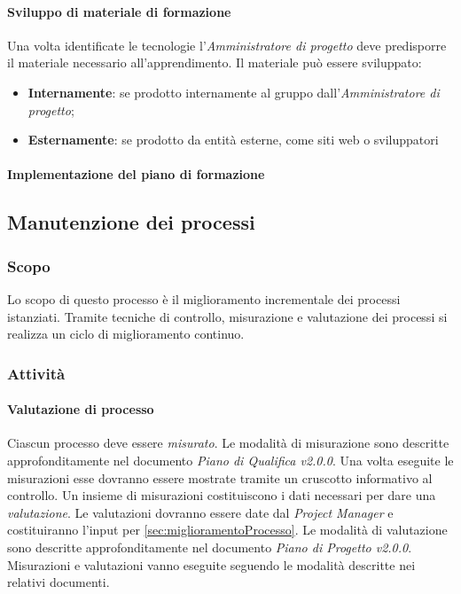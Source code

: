	\paragraph{Sviluppo di materiale di formazione} \Spazio
	Una volta identificate le tecnologie l'\emph{Amministratore di progetto} deve predisporre il materiale necessario all'apprendimento. Il materiale può essere sviluppato: 
	\begin{itemize}
		\item \textbf{Internamente}: se prodotto internamente al gruppo dall'\emph{Amministratore di progetto};
		\item \textbf{Esternamente}: se prodotto da entità esterne, come siti web o sviluppatori 
	\end{itemize}

	\paragraph{Implementazione del piano di formazione} \Spazio


\subsection{Manutenzione dei processi}
\label{sec:manutenzioneProcessi}
\subsubsection{Scopo}
Lo scopo di questo processo è il miglioramento incrementale dei processi istanziati. Tramite tecniche di controllo, misurazione e valutazione dei processi si realizza un ciclo di miglioramento continuo.

\subsubsection{Attività}
	\paragraph{Valutazione di processo} \Spazio
	Ciascun processo deve essere \emph{misurato}. Le modalità di misurazione sono descritte approfonditamente nel documento \emph{Piano di Qualifica v2.0.0}. 
	Una volta eseguite le misurazioni esse dovranno essere mostrate tramite un cruscotto informativo al controllo. Un insieme di misurazioni costituiscono i dati necessari per dare una \emph{valutazione}. Le valutazioni dovranno essere date dal \emph{Project Manager} e costituiranno l'input per \ref{sec:miglioramentoProcesso}. Le modalità di valutazione sono descritte approfonditamente nel documento \emph{Piano di Progetto v2.0.0}. Misurazioni e valutazioni vanno eseguite seguendo le modalità descritte nei relativi documenti.

